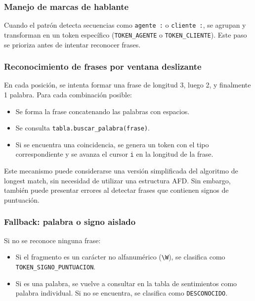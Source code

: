 \subsubsection{Manejo de marcas de hablante}
Cuando el patrón detecta secuencias como \texttt{agente :} o \texttt{cliente :}, se agrupan y
transforman en un token específico (\texttt{TOKEN\_AGENTE} o \texttt{TOKEN\_CLIENTE}). Este
paso se prioriza antes de intentar reconocer frases.

\subsubsection{Reconocimiento de frases por ventana deslizante}
En cada posición, se intenta formar una frase de longitud 3, luego 2, y finalmente 1 palabra.
Para cada combinación posible:

\begin{itemize}
	\item Se forma la frase concatenando las palabras con espacios.

	\item Se consulta \texttt{tabla.buscar\_palabra(frase)}.

	\item Si se encuentra una coincidencia, se genera un token con el tipo correspondiente y se
	      avanza el cursor \texttt{i} en la longitud de la frase.
\end{itemize}

Este mecanismo puede considerarse una versión simplificada del algoritmo de longest match, sin
necesidad de utilizar una estructura AFD. Sin embargo, también puede presentar errores al
detectar frases que contienen signos de puntuación.

\subsubsection{Fallback: palabra o signo aislado}
Si no se reconoce ninguna frase:

\begin{itemize}
	\item Si el fragmento es un carácter no alfanumérico (\texttt{\textbackslash W}), se
	      clasifica como \texttt{TOKEN\_SIGNO\_PUNTUACION}.

	\item Si es una palabra, se vuelve a consultar en la tabla de sentimientos como palabra
	      individual. Si no se encuentra, se clasifica como \texttt{DESCONOCIDO}.
\end{itemize}

